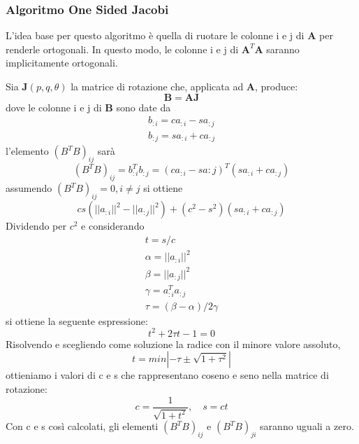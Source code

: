 \subsubsection{Algoritmo One Sided Jacobi}
\label{sec:Algoritmo_One_Sided_Jacobi}
L'idea base per questo algoritmo è quella di ruotare le colonne i e j di $\mathbf{A}$ per renderle ortogonali. In questo modo, le colonne i e j di $\mathbf{A}^T\mathbf{A}$ saranno implicitamente ortogonali.

Sia $\mathbf{J}(p,q,\theta)$ la matrice di rotazione che, applicata ad $\mathbf{A}$, produce:
\begin{equation}
\mathbf{B}=\mathbf{AJ}
\end{equation}
dove le colonne i e j di $\mathbf{B}$ sono date da
\begin{eqnarray}
b_{:i}=ca_{:i}-sa_{:j}\\
b_{:j}=sa_{:i}+ca_{:j}
\end{eqnarray}
l'elemento $(B^TB)_{ij}$ sarà
\[
(B^TB)_{ij}=b_{:i}^Tb_{:j}=(ca_{:i}-sa{:j})^T(sa_{:i}+ca_{:j})
\]
assumendo $(B^TB)_{ij}=0,i\neq j$ si ottiene
\[
cs(||a_{:i}||^2-||a_{:j}||^2)+(c^2-s^2)(sa_{:i}+ca_{:j})
\]
Dividendo per $c^2$ e considerando
\begin{equation*}
\begin{aligned}
t=s/c\\
\alpha = ||a_{:i}||^2\\
\beta = ||a_{:j}||^2\\
\gamma = a_{:i}^Ta_{:j}\\
\tau =(\beta - \alpha)/2\gamma
\end{aligned}
\end{equation*}
si ottiene la seguente espressione:
\begin{equation}
t^2+2\tau t-1=0
\end{equation}
Risolvendo e scegliendo come soluzione la radice con il minore valore assoluto,
\begin{equation}
t=min|-\tau\pm\sqrt{1+\tau^2}|
\end{equation}
ottieniamo i valori di c e s che rappresentano coseno e seno nella matrice di rotazione:
\begin{equation}
c=\frac{1}{\sqrt{1+t^2}},\quad s=ct
\end{equation}
Con c e s così calcolati, gli elementi $(B^TB)_{ij}$ e $(B^TB)_{ji}$ saranno uguali a zero.\cite{Turchetti:SVDAlgorithms}



